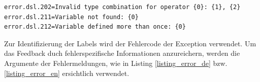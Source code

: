 \begin{lstlisting}[float = htbp,caption={Englische Fehlermeldungen},label=listing_error_en]
error.dsl.202=Invalid type combination for operator {0}: {1}, {2}
error.dsl.211=Variable not found: {0}
error.dsl.212=Variable defined more than once: {0}
\end{lstlisting}

Zur Identifizierung der Labels wird der Fehlercode der Exception verwendet. Um das Feedback duch fehlerspezifische Informationen anzureichern, werden die Argumente der Fehlermeldungen, wie in Listing \ref{listing_error_de} bzw. \ref{listing_error_en} ersichtlich verwendet.




